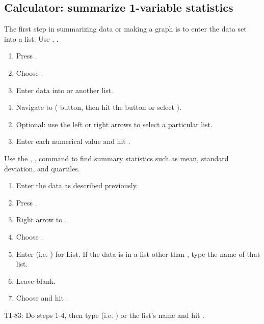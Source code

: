 \subsection{Calculator: summarize 1-variable statistics}
\label{TIsummarizedata}

\begin{termBox}{
The first step in summarizing data or making a graph is to  enter the data set into a list. Use , .
\begin{enumerate}
\setlength{\itemsep}{0mm}
\item Press .
\item Choose .
\item Enter data into  or another list.
\end{enumerate}
}
\end{termBox}

\begin{termBox}{
\begin{enumerate}
\setlength{\itemsep}{0mm}
\item Navigate to  ( button, then hit the  button or select ).
\item Optional: use the left or right arrows to select a particular list.
\item Enter each numerical value and hit .
\end{enumerate}
}
\end{termBox}

\begin{termBox}{
Use the , ,  command to find summary statistics such as mean, standard deviation, and quartiles.
\begin{enumerate}
\setlength{\itemsep}{0mm}
\item Enter the data as described previously.
\item Press .
\item Right arrow to .
\item Choose .
\item Enter  (i.e.  ) for List. If the data is in a list other than , type the name of that list.
\item Leave  blank.
\item Choose  and hit .
\end{enumerate}
TI-83: Do steps 1-4, then type  (i.e.  ) or the list's name and hit .
}
\end{termBox}

